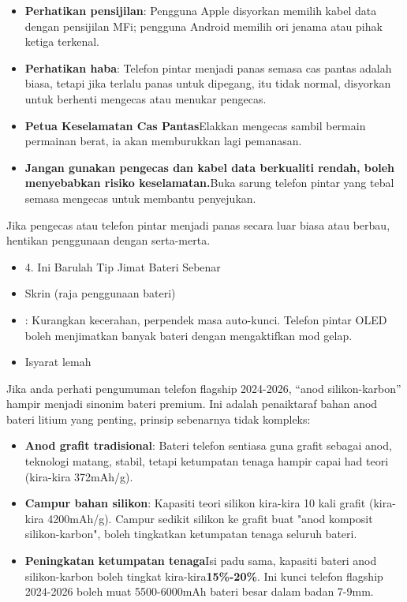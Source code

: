 
\begin{itemize}
  \item \textbf{Perhatikan pensijilan}: Pengguna Apple disyorkan memilih kabel data dengan pensijilan MFi; pengguna Android memilih ori jenama atau pihak ketiga terkenal.
  \item \textbf{Perhatikan haba}: Telefon pintar menjadi panas semasa cas pantas adalah biasa, tetapi jika terlalu panas untuk dipegang, itu tidak normal, disyorkan untuk berhenti mengecas atau menukar pengecas.
  \item \textbf{Petua Keselamatan Cas Pantas}Elakkan mengecas sambil bermain permainan berat, ia akan memburukkan lagi pemanasan.
  \item \textbf{Jangan gunakan pengecas dan kabel data berkualiti rendah, boleh menyebabkan risiko keselamatan.}Buka sarung telefon pintar yang tebal semasa mengecas untuk membantu penyejukan.
\end{itemize}

\begin{tcbwarn}{Jika pengecas atau telefon pintar menjadi panas secara luar biasa atau berbau, hentikan penggunaan dengan serta-merta.}
\begin{itemize}
  \item 4. Ini Barulah Tip Jimat Bateri Sebenar
  \item Skrin (raja penggunaan bateri)
  \item : Kurangkan kecerahan, perpendek masa auto-kunci. Telefon pintar OLED boleh menjimatkan banyak bateri dengan mengaktifkan mod gelap.
  \item Isyarat lemah
\end{itemize}

\end{tcbwarn}


Jika anda perhati pengumuman telefon flagship 2024-2026, “anod silikon-karbon” hampir menjadi sinonim bateri premium. Ini adalah penaiktaraf bahan anod bateri litium yang penting, prinsip sebenarnya tidak kompleks:

\begin{itemize}
  \item \textbf{Anod grafit tradisional}: Bateri telefon sentiasa guna grafit sebagai anod, teknologi matang, stabil, tetapi ketumpatan tenaga hampir capai had teori (kira-kira 372mAh/g).
  \item \textbf{Campur bahan silikon}: Kapasiti teori silikon kira-kira 10 kali grafit (kira-kira 4200mAh/g). Campur sedikit silikon ke grafit buat "anod komposit silikon-karbon", boleh tingkatkan ketumpatan tenaga seluruh bateri.
  \item \textbf{Peningkatan ketumpatan tenaga}Isi padu sama, kapasiti bateri anod silikon-karbon boleh tingkat kira-kira\textbf{15\%-20\%}. Ini kunci telefon flagship 2024-2026 boleh muat 5500-6000mAh bateri besar dalam badan 7-9mm.
\end{itemize}

